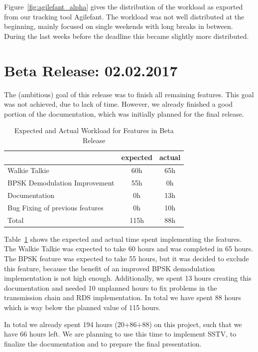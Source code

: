 	Figure~\ref{fig:agilefant_alpha} gives the distribution of the workload as exported from our tracking tool Agilefant. The workload was not well distributed at the beginning, mainly focused on single weekends with long breaks in between. During the last weeks before the deadline this became slightly more distributed. 

\section{Beta Release: 02.02.2017}
The (ambitious) goal of this release was to finish all remaining features. This goal was not achieved, due to lack of time. However, we already finished a good portion of the documentation, which was initially planned for the final release. 

\begin{table}[!htbp]
	\centering
	\caption{Expected and Actual Workload for Features in Beta Release}
	\label{tab:beta:features}
	\begin{tabular}{ l | c | c }
		& expected  & actual \\ \hline
		Walkie Talkie & 60h & 65h \\  \hline
		BPSK Demodulation Improvement & 55h & 0h \\  \hline
		Documentation & 0h & 13h \\ \hline \hline
		Bug Fixing of previous features & 0h & 10h \\ \hline \hline 
		Total & 115h & 88h 
	\end{tabular}
\end{table}
Table~\ref{tab:beta:features} shows the expected and actual time spent implementing the features. The Walkie Talkie was expected to take 60 hours and was completed in 65 hours. The BPSK feature was expected to take 55 hours, but it was decided to exclude this feature, because the benefit of an improved BPSK demodulation implementation is not high enough. 
Additionally, we spent 13 hours creating this documentation and needed 10 unplanned hours to fix problems in the transmission chain and RDS implementation. In total we have spent 88 hours which is way below the planned value of 115 hours. 

In total we already spent 194 hours (20+86+88) on this project, such that we have 66 hours left. We are planning to use this time to implement \ac{SSTV}, to finalize the documentation and to prepare the final presentation. 


